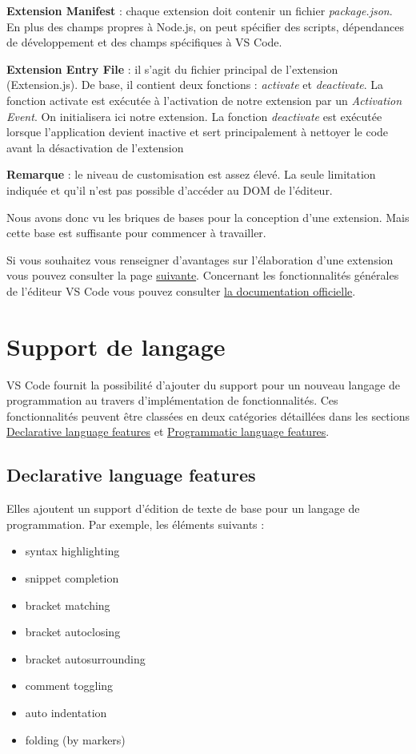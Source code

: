 \documentclass[
    iict, %
    il, %
]{heig-tb}
\begin{document}
\textbf{Extension Manifest} :
chaque extension doit contenir un fichier \emph{package.json}. En plus des champs propres à Node.js, on peut spécifier des scripts, dépendances de développement et des champs spécifiques à VS Code.

\textbf{Extension Entry File} :
il s'agit du fichier principal de l'extension (Extension.js).
De base, il contient deux fonctions : \emph{activate} et \emph{deactivate}.
La fonction activate est exécutée à l'activation de notre extension par un \emph{Activation Event}. On initialisera ici notre extension.
La fonction \emph{deactivate} est exécutée lorsque l'application devient inactive et sert principalement à nettoyer le code avant la désactivation de l'extension

\textbf{Remarque} : le niveau de customisation est assez élevé. La seule limitation indiquée et qu'il n'est pas possible d'accéder au DOM de l'éditeur.

Nous avons donc vu les briques de bases pour la conception d'une extension. Mais cette base est suffisante pour commencer à travailler.

Si vous souhaitez vous renseigner d'avantages sur l'élaboration d'une extension vous pouvez consulter la page \href{https://code.visualstudio.com/api}{suivante}.
Concernant les fonctionnalités générales de l'éditeur VS Code vous pouvez consulter \href{https://code.visualstudio.com/docs}{la documentation officielle}.

\section{Support de langage}
VS Code fournit la possibilité d'ajouter du support pour un nouveau langage de programmation au travers d'implémentation de fonctionnalités. Ces fonctionnalités peuvent être classées en deux catégories détaillées
dans les sections \hyperref[Declarative language features]{Declarative language features} et \hyperref[Programmatic language features]{Programmatic language features}.

\subsection{Declarative language features}\label{Declarative language features}
Elles ajoutent un support d'édition de texte de base pour un langage de programmation.
Par exemple, les éléments suivants :

\begin{itemize}
    \item syntax highlighting
    \item snippet completion
    \item bracket matching
    \item bracket autoclosing
    \item bracket autosurrounding
    \item comment toggling
    \item auto indentation
    \item folding (by markers)
\end{itemize}
\end{document}
